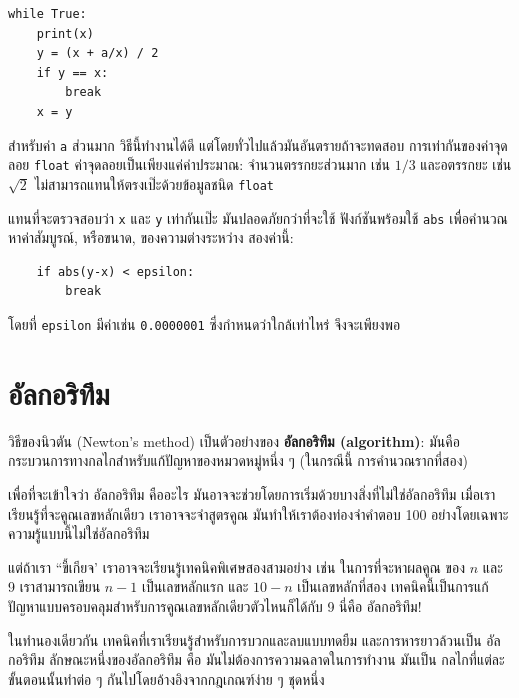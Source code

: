 \begin{verbatim}
while True:
    print(x)
    y = (x + a/x) / 2
    if y == x:
        break
    x = y
\end{verbatim}
%
สำหรับค่า {\tt a} ส่วนมาก วิธีนี้ทำงานได้ดี แต่โดยทั่วไปแล้วมันอันตรายถ้าจะทดสอบ
การเท่ากันของค่าจุดลอย {\tt float} ค่าจุดลอยเป็นเพียงแค่ค่าประมาณ: จำนวนตรรกยะส่วนมาก
เช่น $1/3$ และอตรรกยะ เช่น $\sqrt{2}$ ไม่สามารถแทนให้ตรงเป๊ะด้วยข้อมูลชนิด {\tt float}

แทนที่จะตรวจสอบว่า {\tt x} และ {\tt y} เท่ากันเป๊ะ มันปลอดภัยกว่าที่จะใช้
ฟังก์ชันพร้อมใช้ {\tt abs} เพื่อคำนวณหาค่าสัมบูรณ์, หรือขนาด, ของความต่างระหว่าง
สองค่านี้:

\begin{verbatim}
    if abs(y-x) < epsilon:
        break
\end{verbatim}
%
โดยที่ \verb"epsilon" มีค่าเช่น {\tt 0.0000001} ซึ่งกำหนดว่าใกล้เท่าไหร่
จึงจะเพียงพอ


\section{อัลกอริทึม} %

วิธีของนิวตัน (Newton's method) เป็นตัวอย่างของ {\bf อัลกอริทึม (algorithm)}: 
มันคือกระบวนการทางกลไกสำหรับแก้ปัญหาของหมวดหมู่หนึ่ง ๆ (ในกรณีนี้ การคำนวณรากที่สอง) 

เพื่อที่จะเข้าใจว่า อัลกอริทึม คืออะไร มันอาจจะช่วยโดยการเริ่มด้วยบางสิ่งที่ไม่ใช่อัลกอริทึม
เมื่อเราเรียนรู้ที่จะคูณเลขหลักเดียว เราอาจจะจำสูตรคูณ มันทำให้เราต้องท่องจำคำตอบ 100 
อย่างโดยเฉพาะ ความรู้แบบนี้ไม่ใช่อัลกอริทึม

แต่ถ้าเรา ``ขี้เกียจ' เราอาจจะเรียนรู้เทคนิคพิเศษสองสามอย่าง เช่น ในการที่จะหาผลคูณ
ของ $n$ และ 9 เราสามารถเขียน $n-1$ เป็นเลขหลักแรก และ $10-n$ เป็นเลขหลักที่สอง
เทคนิคนี้เป็นการแก้ปัญหาแบบครอบคลุมสำหรับการคูณเลขหลักเดียวตัวไหนก็ได้กับ 9
นี่คือ อัลกอริทึม!

ในทำนองเดียวกัน เทคนิคที่เราเรียนรู้สำหรับการบวกและลบแบบทดยืม และการหารยาวล้วนเป็น 
อัลกอริทึม ลักษณะหนึ่งของอัลกอริทึม คือ มันไม่ต้องการความฉลาดในการทำงาน มันเป็น
กลไกที่แต่ละขั้นตอนนั้นทำต่อ ๆ กันไปโดยอ้างอิงจากกฎเกณฑ์ง่าย ๆ ชุดหนึ่ง 

